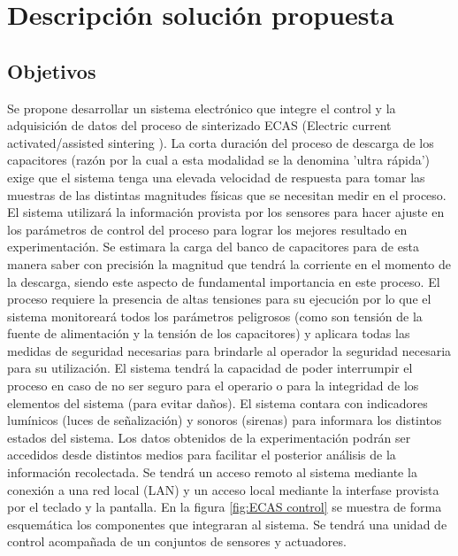 \documentclass[12pt]{article}
\begin{document}
% 

  

\newpage

\section{Descripción solución propuesta}

\subsection{Objetivos}
  
  Se propone desarrollar un sistema electrónico que integre el control y la adquisición de datos del proceso de sinterizado ECAS (Electric current activated/assisted
  sintering ). La corta duración del proceso de descarga de los capacitores (razón por la cual a esta modalidad se la denomina 'ultra rápida')
  exige que el sistema tenga una elevada velocidad de respuesta para tomar las muestras de las distintas magnitudes físicas que se necesitan medir en el proceso.
  El sistema utilizará la información provista por los sensores para hacer ajuste en los parámetros de control del proceso para lograr los mejores resultado 
  en experimentación.
  Se estimara la carga del banco de capacitores para de esta manera saber con precisión la magnitud que tendrá la corriente en el momento de la descarga,
  siendo este aspecto de fundamental importancia en este proceso.
  El proceso requiere la presencia de altas tensiones para su ejecución por lo que el sistema monitoreará todos los parámetros peligrosos (como son tensión de la fuente
  de alimentación y la tensión de los capacitores) y aplicara todas las medidas de seguridad necesarias para brindarle al operador la seguridad necesaria
  para su utilización. El sistema tendrá la capacidad de poder interrumpir el proceso en caso de no ser seguro para el operario o para la integridad de los elementos
  del sistema (para evitar daños). El sistema contara con indicadores lumínicos (luces de señalización) y sonoros (sirenas) para informara los distintos
  estados del sistema.
  Los datos obtenidos de la experimentación podrán ser accedidos desde distintos medios para facilitar el posterior análisis de la información recolectada.
  Se tendrá un acceso remoto al sistema mediante la conexión a una red local (LAN) y un acceso local mediante la interfase provista por el teclado y la pantalla.
  En la figura \ref{fig:ECAS control} se muestra de forma esquemática los componentes que integraran al sistema. Se tendrá una unidad de control acompañada de
  un conjuntos de sensores y actuadores.
\end{document}
